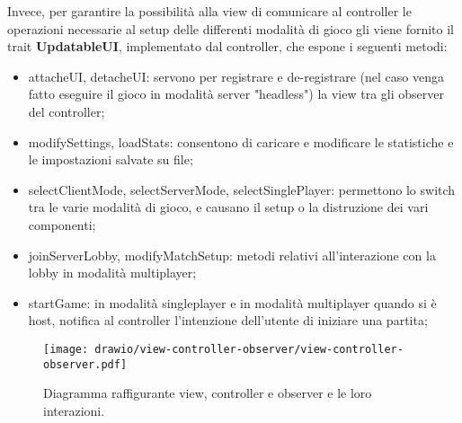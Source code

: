Invece, per garantire la possibilità alla view di comunicare al controller le operazioni necessarie al setup delle differenti modalità di gioco gli viene fornito il trait \textbf{UpdatableUI}, implementato dal controller, che espone i seguenti metodi:
\begin{itemize}
    \item attacheUI, detacheUI: servono per registrare e de-registrare (nel caso venga fatto eseguire il gioco in modalità server "headless") la view tra gli observer del controller;
    \item modifySettings, loadStats: consentono di caricare e modificare le statistiche e le impostazioni salvate su file;
    \item selectClientMode, selectServerMode, selectSinglePlayer: permettono lo switch tra le varie modalità di gioco, e causano il setup o la distruzione dei vari componenti;
    \item joinServerLobby, modifyMatchSetup: metodi relativi all'interazione con la lobby in modalità multiplayer;
    \item startGame: in modalità singleplayer e in modalità multiplayer quando si è host, notifica al controller l'intenzione dell'utente di iniziare una partita;
\end{itemize}




\begin{figure}[H]
	\centering
	\texttt{[image: drawio/view-controller-observer/view-controller-observer.pdf]}
	\caption{Diagramma raffigurante view, controller e observer e le loro interazioni.}
	\label{fig:view-controller-observer}
\end{figure}